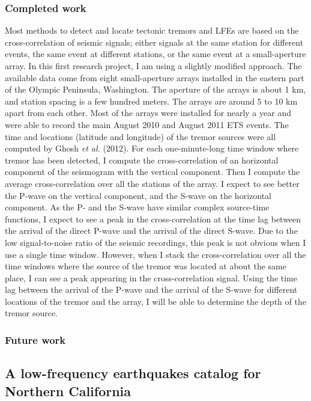 \documentclass[letterpaper, 12pt]{article}
\begin{document}
\subsubsection*{Completed work}

Most methods to detect and locate tectonic tremors and LFEs are based on the cross-correlation of seismic signals; either signals at the same station for different events, the same event at different stations, or the same event at a small-aperture array. In this first research project, I am using a slightly modified approach. The available data come from eight small-aperture arrays installed in the eastern part of the Olympic Peninsula, Washington. The aperture of the arrays is about 1 km, and station spacing is a few hundred meters. The arrays are around 5 to 10 km apart from each other. Most of the arrays were installed for nearly a year and were able to record the main August 2010 and August 2011 ETS events. The time and locations (latitude and longitude) of the tremor sources were all computed by Ghosh \textit{et al.} (2012). For each one-minute-long time window where tremor has been detected, I compute the cross-correlation of an horizontal component of the seismogram with the vertical component. Then I compute the average cross-correlation over all the stations of the array. I expect to see better the P-wave on the vertical component, and the S-wave on the horizontal component. As the P- and the S-wave have similar complex source-time functions, I expect to see a peak in the cross-correlation at the time lag between the arrival of the direct P-wave and the arrival of the direct S-wave. Due to the low signal-to-noise ratio of the seismic recordings, this peak is not obvious when I use a single time window. However, when I stack the cross-correlation over all the time windows where the source of the tremor was located at about the same place, I can see a peak appearing in the cross-correlation signal. Using the time lag between the arrival of the P-wave and the arrival of the S-wave for different locations of the tremor and the array, I will be able to determine the depth of the tremor source.

\subsubsection*{Future work}

\subsection{A low-frequency earthquakes catalog for Northern California}
\end{document}
